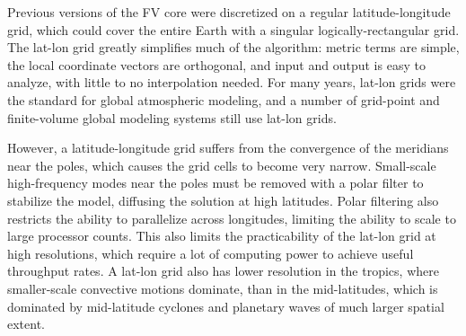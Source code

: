 \documentclass[10pt,letterpaper,margin=1in]{memoir}
\begin{document}
Previous versions of the FV core were discretized on a regular latitude-longitude grid, which could cover the entire Earth with a singular logically-rectangular grid. The lat-lon grid greatly simplifies much of the algorithm: metric terms are simple, the local coordinate vectors are orthogonal, and input and output is easy to analyze, with little to no interpolation needed. 
For many years, lat-lon grids were the standard for global atmospheric modeling, and a number of grid-point and finite-volume global modeling systems still use lat-lon grids.

However, a latitude-longitude grid suffers from the convergence of the meridians near the poles, which causes the grid cells to become very narrow. Small-scale high-frequency modes near the poles must be removed with a polar filter to stabilize the model, diffusing the solution at high latitudes. Polar filtering also restricts the ability to parallelize across longitudes, limiting the ability to scale to large processor counts. This also limits the practicability of the lat-lon grid at high resolutions, which require a lot of computing power to achieve useful throughput rates. A lat-lon grid also has lower resolution in the tropics, where smaller-scale convective motions dominate, than in the mid-latitudes, which is dominated by mid-latitude cyclones and planetary waves of much larger spatial extent.
\end{document}
